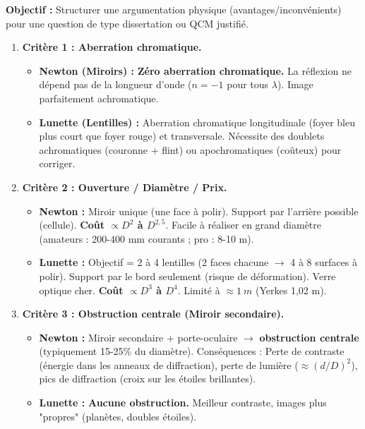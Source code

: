 \documentclass[11pt]{article}
\begin{document}
\begin{methode}
\textbf{Objectif :} Structurer une argumentation physique (avantages/inconvénients) pour une question de type dissertation ou QCM justifié.
\begin{enumerate}
    \item \textbf{Critère 1 : Aberration chromatique.}
    \begin{itemize}
        \item \textbf{Newton (Miroirs) :} \textbf{Zéro aberration chromatique.} La réflexion ne dépend pas de la longueur d'onde ($n=-1$ pour tous $\lambda$). Image parfaitement achromatique.
        \item \textbf{Lunette (Lentilles) :} Aberration chromatique longitudinale (foyer bleu plus court que foyer rouge) et transversale. Nécessite des doublets achromatiques (couronne + flint) ou apochromatiques (coûteux) pour corriger.
    \end{itemize}
    \item \textbf{Critère 2 : Ouverture / Diamètre / Prix.}
    \begin{itemize}
        \item \textbf{Newton :} Miroir unique (une face à polir). Support par l'arrière possible (cellule). \textbf{Coût $\propto D^2$ à $D^{2,5}$}. Facile à réaliser en grand diamètre (amateurs : 200-400 mm courants ; pro : 8-10 m).
        \item \textbf{Lunette :} Objectif = 2 à 4 lentilles (2 faces chacune $\rightarrow$ 4 à 8 surfaces à polir). Support par le bord seulement (risque de déformation). Verre optique cher. \textbf{Coût $\propto D^3$ à $D^4$}. Limité à $\approx \SI{1}{m}$ (Yerkes 1,02 m).
    \end{itemize}
    \item \textbf{Critère 3 : Obstruction centrale (Miroir secondaire).}
    \begin{itemize}
        \item \textbf{Newton :} Miroir secondaire + porte-oculaire $\rightarrow$ \textbf{obstruction centrale} (typiquement 15-25\% du diamètre). Conséquences : Perte de contraste (énergie dans les anneaux de diffraction), perte de lumière ($\approx (d/D)^2$), pics de diffraction (croix sur les étoiles brillantes).
        \item \textbf{Lunette :} \textbf{Aucune obstruction.} Meilleur contraste, images plus "propres" (planètes, doubles étoiles).
    \end{itemize}

\end{enumerate}
\end{methode}
\end{document}
